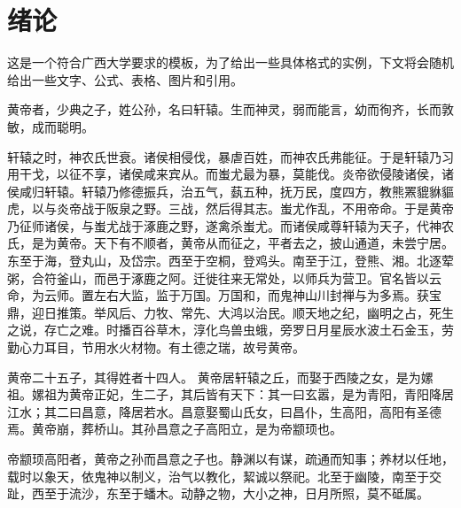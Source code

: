 \documentclass[UTF8,12pt,AutoFakeBold,fontset=fandol]{ctexart}
\begin{document}
	
	{\hypersetup{colorlinks=true,linkcolor=black}\tableofcontents}
	\newpage
	\setcounter{page}{1} %
	\pagestyle{fancy}%
	\fancyhf{}
	\fancyfoot[C]{\thepage} %
	\section{绪论\label{绪论}}
	这是一个符合广西大学要求的模板，为了给出一些具体格式的实例，下文将会随机给出一些文字、公式、表格、图片和引用\cite{doi:10.1080/00107514.2012.685693,annurev:/content/journals/10.1146/annurev-nucl-102014-022137,GROOM1986323,doi:10.1142/S0217751X20300124}。
	\par
	黄帝者，少典之子，姓公孙，名曰轩辕。生而神灵，弱而能言，幼而徇齐，长而敦敏，成而聪明\cite{HOOFT1974276,PismaZhETF.20.430}。
	\par
	轩辕之时，神农氏世衰。诸侯相侵伐，暴虐百姓，而神农氏弗能征。于是轩辕乃习用干戈，以征不享，诸侯咸来宾从。而蚩尤最为暴，莫能伐。炎帝欲侵陵诸侯，诸侯咸归轩辕。轩辕乃修德振兵，治五气，蓺五种，抚万民，度四方，教熊罴貔貅貙虎，以与炎帝战于阪泉之野。三战，然后得其志。蚩尤作乱，不用帝命。于是黄帝乃征师诸侯，与蚩尤战于涿鹿之野，遂禽杀蚩尤。而诸侯咸尊轩辕为天子\cite{PhysRevLett.33.451}，代神农氏，是为黄帝。天下有不顺者，黄帝从而征之，平者去之，披山通道，未尝宁居。
	东至于海，登丸山，及岱宗。西至于空桐，登鸡头。南至于江，登熊、湘。北逐荤粥，合符釜山，而邑于涿鹿之阿。迁徙往来无常处，以师兵为营卫。官名皆以云命，为云师。置左右大监，监于万国。万国和，而鬼神山川封禅与为多焉。获宝鼎，迎日推策。举风后、力牧、常先、大鸿以治民。顺天地之纪，幽明之占，死生之说，存亡之难。时播百谷草木，淳化鸟兽虫蛾，旁罗日月星辰水波土石金玉，劳勤心力耳目，节用水火材物。有土德之瑞，故号黄帝。
	\par
	黄帝二十五子，其得姓者十四人。
	黄帝居轩辕之丘，而娶于西陵之女，是为嫘祖。嫘祖为黄帝正妃，生二子，其后皆有天下：其一曰玄嚣，是为青阳\cite{STAROBINSKY198099,PhysRevD.23.347}，青阳降居江水；其二曰昌意，降居若水。昌意娶蜀山氏女，曰昌仆，生高阳，高阳有圣德焉。黄帝崩，葬桥山。其孙昌意之子高阳立，是为帝颛顼也。
	\par
	帝颛顼高阳者，黄帝之孙而昌意之子也。静渊以有谋，疏通而知事；养材以任地，载时以象天，依鬼神以制义，治气以教化，絜诚以祭祀。北至于幽陵，南至于交趾，西至于流沙，东至于蟠木。动静之物，大小之神，日月所照，莫不砥属。
\end{document}
